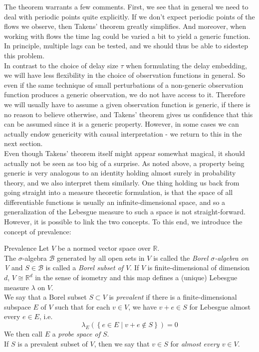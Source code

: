 \documentclass[11pt, a4paper]{memoir}
\theoremstyle{break}
\theoremstyle{break}
\theoremstyle{nonumberplain}
\newcommand{\mR}{\mathbb{R}}
\begin{document}
The theorem warrants a few comments. First, we see that in general we need to deal with periodic points quite explicitly. If we don't expect periodic points of the flows we observe, then Takens' theorem greatly simplifies. And moreover, when working with flows the time lag could be varied a bit to yield a generic function. In principle, multiple lags can be tested, and we should thus be able to sidestep this problem. \\[5pt]
In contrast to the choice of delay size $\tau$ when formulating the delay embedding, we will have less flexibility in the choice of observation functions in general. So even if the same technique of small perturbations of a non-generic observation function produces a generic observation, we do not have access to it. Therefore we will usually have to assume a given observation function is generic, if there is no reason to believe otherwise, and Takens' theorem gives us confidence that this can be assumed since it is a generic property. However, in some cases we can actually endow genericity with causal interpretation - we return to this in the next section.\\[5pt]
Even though Takens' theorem itself might appear somewhat magical, it should actually not be seen as too big of a surprise. As noted above, a property being generic is very analogous to an identity holding almost surely in probability theory, and we also interpret them similarly. One thing holding us back from going straight into a measure theoretic formulation, is that the space of all differentiable functions is usually an infinite-dimensional space, and so a generalization of the Lebesgue measure to such a space is not straight-forward. However, it is possible to link the two concepts. To this end, we introduce the concept of prevalence:
\begin{mydefinition}{Prevalence}
Let $V$ be a normed vector space over $\mR$.\\[5pt]
The $\sigma$-algebra $\mathcal{B}$ generated by all open sets in $V$ is called the \emph{Borel $\sigma$-algebra on V} and $S\in \mathcal{B}$ is called a \emph{Borel subset of $V$}. If $V$ is finite-dimensional of dimension $d$, $V\cong \mR^d$ in the sense of isometry and this map defines a (unique) Lebesgue measure $\lambda $ on $V$.\\[5pt]
We say that a Borel subset $S\subset V$ is \emph{prevalent} if there is a finite-dimensional subspace $E$ of $V$ such that for each $v\in V$, we have $v+e\in S$ for Lebesgue almost every $e\in E$, i.e.
$$\lambda_E\left(\left\{e\in E\mid v+e\notin S\right\}\right)=0$$
We then call $E$ a \emph{probe space of $S$}.\\[5pt]
If $S$ is a prevalent subset of $V$, then we say that $v\in S$ for \emph{almost every $v\in V$}.
\end{mydefinition}
\end{document}
